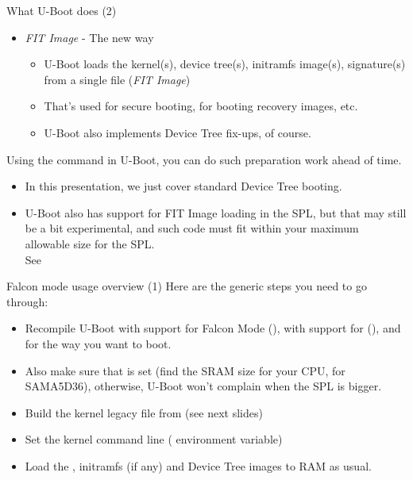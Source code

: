 \begin{frame}{What U-Boot does (2)}
  \begin{itemize}
    \item {\em FIT Image} - The new way
    \begin{itemize}
	\item U-Boot loads the kernel(s), device tree(s), initramfs
	      image(s), signature(s) from a single file ({\em FIT Image})
	\item That's used for secure booting, for booting recovery
	      images, etc.
	\item U-Boot also implements Device Tree fix-ups, of course.
    \end{itemize}
  \end{itemize}
  Using the  command in U-Boot, you can do such
  preparation work ahead of time.

  \begin{itemize}
     \item In this presentation, we just cover standard Device Tree
	   booting.
     \item U-Boot also has support for FIT Image loading in the SPL, but
           that may still be a bit experimental, and such code must fit
           within your maximum allowable size for the SPL.\\
           See 
  \end{itemize}
\end{frame}

\begin{frame}{Falcon mode usage overview (1)}
   Here are the generic steps you need to go through:
   \begin{itemize}
     \item Recompile U-Boot with support for Falcon Mode
           (), with support
	   for  (),
	   and for the way you want to boot.
     \item Also make sure that  is
	   set (find the SRAM size for your CPU,  for
           SAMA5D36), otherwise, U-Boot won't complain when the SPL
	   is bigger.
     \item Build the kernel legacy  file from 
	   (see next slides)
     \item Set the kernel command line ( environment variable)
     \item Load the , initramfs (if any) and Device Tree images
	   to RAM as usual.
   \end{itemize}
\end{frame}

